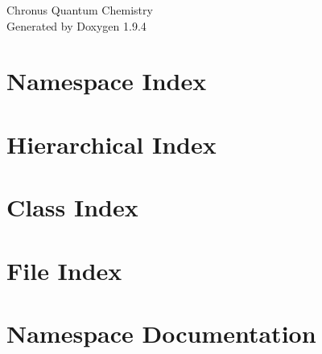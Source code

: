 \documentclass[twoside]{book}
\newcommand{\+}{\discretionary{\mbox{\scriptsize$\hookleftarrow$}}{}{}}
\newcommand{\clearemptydoublepage}{%
    \newpage{\pagestyle{empty}\cleardoublepage}%
  }
\begin{document}
  \raggedbottom
    \hypersetup{pageanchor=false,
                bookmarksnumbered=true,
                pdfencoding=unicode
               }
  \begin{titlepage}
  \vspace*{7cm}
  \begin{center}%
  {\Large Chronus Quantum Chemistry}\\
  \vspace*{1cm}
  {\large Generated by Doxygen 1.9.4}\\
  \end{center}
  \end{titlepage}
  \clearemptydoublepage
  \tableofcontents
  \clearemptydoublepage
  \hypersetup{pageanchor=true}
\chapter{Namespace Index}

\chapter{Hierarchical Index}

\chapter{Class Index}

\chapter{File Index}

\chapter{Namespace Documentation}


\end{document}
